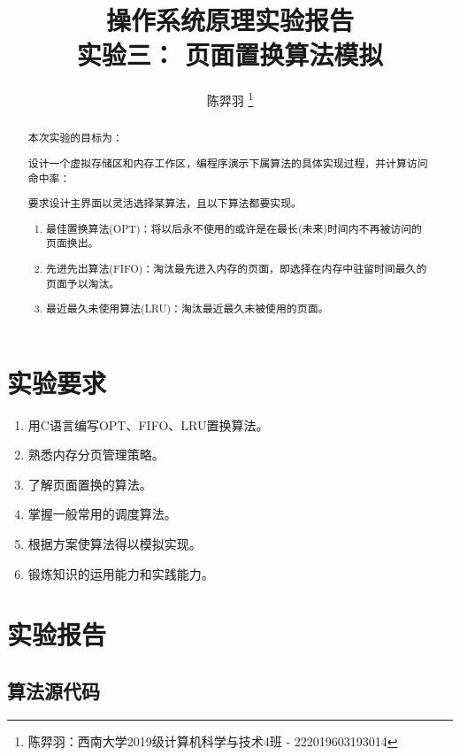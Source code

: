 \documentclass[a4paper,UTF8,heading=false,12pt]{article}
\newcommand\subtitle[1]{{\small #1}}
\begin{document}
\title{
    操作系统原理实验报告 \\
    \subtitle{实验三： 页面置换算法模拟}
}
\author{陈羿羽 \thanks{陈羿羽：西南大学2019级计算机科学与技术4班 - 222019603193014}}
\maketitle

\begin{abstract}
    本次实验的目标为：

    设计一个虚拟存储区和内存工作区，编程序演示下属算法的具体实现过程，并计算访问命中率：

    要求设计主界面以灵活选择某算法，且以下算法都要实现。

    \begin{enumerate}
        \item 最佳置换算法(OPT)：将以后永不使用的或许是在最长(未来)时间内不再被访问的页面换出。
        \item 先进先出算法(FIFO)：淘汰最先进入内存的页面，即选择在内存中驻留时间最久的页面予以淘汰。
        \item 最近最久未使用算法(LRU)：淘汰最近最久未被使用的页面。
    \end{enumerate}
\end{abstract}

\newpage

\section{实验要求}

\begin{enumerate}
    \item 用C语言编写OPT、FIFO、LRU置换算法。
    \item 熟悉内存分页管理策略。
    \item 了解页面置换的算法。
    \item 掌握一般常用的调度算法。
    \item 根据方案使算法得以模拟实现。
    \item 锻炼知识的运用能力和实践能力。
\end{enumerate}

\section{实验报告}

\subsection{算法源代码}
\end{document}
